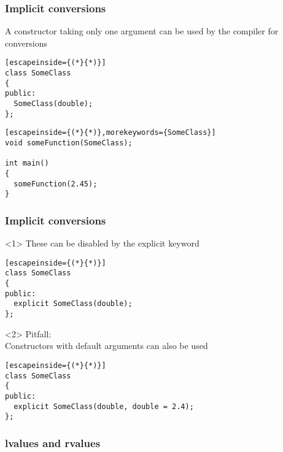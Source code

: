 \documentclass[14pt,a4paper,dvipsnames,usenames]{beamer}
\begin{document}
\begin{frame}[fragile]
  \frametitle{Implicit conversions}

  A constructor taking only one argument can be used by the compiler for conversions
  
  \vspace{.3em}
  \begin{lstlisting}[escapeinside={(*}{*)}]
class SomeClass
{
public:
  SomeClass(double);
};
  \end{lstlisting}
  \begin{lstlisting}[escapeinside={(*}{*)},morekeywords={SomeClass}]
void someFunction(SomeClass);

int main()
{
  someFunction(2.45);
}
  \end{lstlisting}
  
\end{frame}

\begin{frame}[fragile]
  \frametitle{Implicit conversions}

  \begin{onlyenv}<1>
  These can be disabled by the {\color{FeebleWeek}explicit} keyword

  \vspace{.5em}
  \begin{lstlisting}[escapeinside={(*}{*)}]
class SomeClass
{
public:
  explicit SomeClass(double);
};
  \end{lstlisting}
  \end{onlyenv}

  \begin{onlyenv}<2>
  {\color{Marty}Pitfall:}\\Constructors with default arguments can also be used

  \vspace{.5em}
  \begin{lstlisting}[escapeinside={(*}{*)}]
class SomeClass
{
public:
  explicit SomeClass(double, double = 2.4);
};
  \end{lstlisting}
  \end{onlyenv}

\end{frame}

\begin{frame}
  \frametitle{lvalues and rvalues}

  \begin{center}
  \end{center}

\end{frame}
\end{document}
